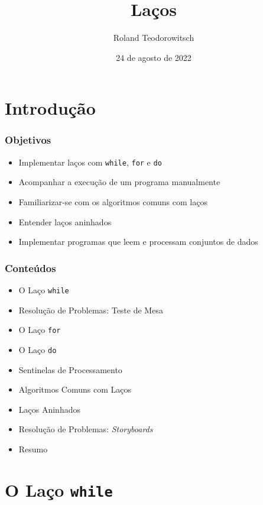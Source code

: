 \documentclass[xcolor={dvipsnames,table},aspectratio=169]{beamer}
\title[\sc{Laços}]{Laços}
\author[Roland Teodorowitsch]{Roland Teodorowitsch}
\institute[FPROG - EP - PUCRS]{Fundamentos de Programação - Escola Politécnica - PUCRS}
\date{24 de agosto de 2022}
\begin{document}
\justifying

\begin{frame}
	\titlepage
\end{frame}

\section{Introdução}

\begin{frame}\frametitle{Objetivos}
\begin{itemize}
	\item Implementar laços com \texttt{while}, \texttt{for} e \texttt{do}
	\item Acompanhar a execução de um programa manualmente
	\item Familiarizar-se com os algoritmos comuns com laços
	\item Entender laços aninhados
	\item Implementar programas que leem e processam conjuntos de dados
\end{itemize}
\end{frame}

\begin{frame}\frametitle{Conteúdos}
\begin{itemize}
	\item O Laço \texttt{while}
	\item Resolução de Problemas: Teste de Mesa
	\item O Laço \texttt{for}
	\item O Laço \texttt{do}
	\item Sentinelas de Processamento
	\item Algoritmos Comuns com Laços
	\item Laços Aninhados
	\item Resolução de Problemas: \emph{Storyboards}
	\item Resumo
\end{itemize}
\end{frame}

\section{O Laço \texttt{while}}
\end{document}
